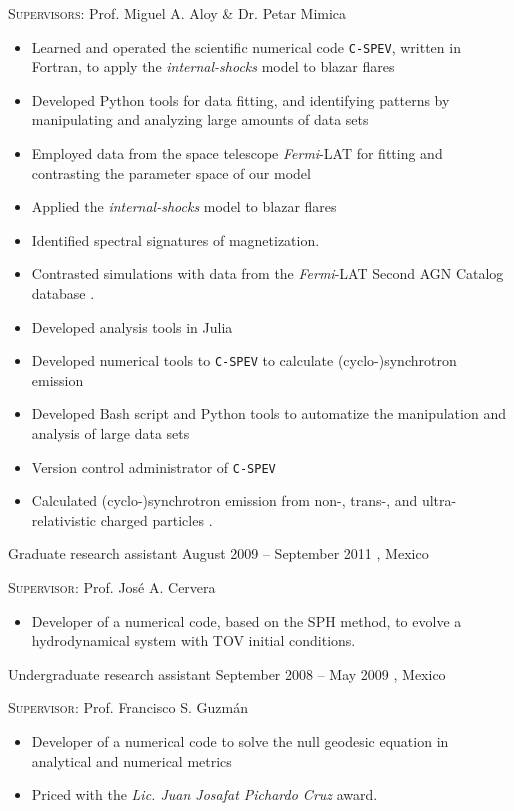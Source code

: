 {\textsc{Supervisors}: Prof. Miguel A. Aloy \& Dr. Petar Mimica
  \begin{itemize}
    \item Learned and operated the scientific numerical code \texttt{C-SPEV}, written in Fortran, to apply the \emph{internal-shocks} model to blazar flares
    \item Developed Python tools for data fitting, and identifying patterns by manipulating and analyzing large amounts of data sets
    \item Employed data from the space telescope \emph{Fermi}-LAT for fitting and contrasting the parameter space of our model
    \item Applied the \emph{internal-shocks} model to blazar flares
    \item Identified spectral signatures of magnetization.
    \item Contrasted simulations with data from the \emph{Fermi}-LAT Second AGN Catalog database \cite{RuedaBecerril:2014mi}.
    \item Developed analysis tools in Julia
    \item Developed numerical tools to \texttt{C-SPEV} to calculate (cyclo-)synchrotron emission
    \item Developed Bash script and Python tools to automatize the manipulation and analysis of large data sets
    \item Version control administrator of \texttt{C-SPEV}
    \item Calculated (cyclo-)synchrotron emission from non-, trans-, and ultra-relativistic charged particles \cite{RuedaBecerril:2017mi}.
  \end{itemize}
}
\cventry{}%
{\IFMes}%
{Graduate research assistant}%
{\hspace{-30ex}August 2009 -- September 2011}%
{\UMSNHes, Mexico}%
{\textsc{Supervisor}: Prof. José A. Cervera
  \begin{itemize}
    \item Developer of a numerical code, based on the SPH method, to evolve a hydrodynamical system with TOV initial conditions.
  \end{itemize}
}
\cventry{}%
{\FCes}%
{Undergraduate research assistant}%
{September 2008 -- May 2009}%
{\UAEMes, Mexico}%
{\textsc{Supervisor}: Prof. Francisco S. Guzmán
  \begin{itemize}
    \item Developer of a numerical code to solve the null geodesic equation in analytical and numerical metrics \cite{Guzman:2009ru}
    \item Priced with the \emph{Lic. Juan Josafat Pichardo Cruz} award.
  \end{itemize}
}
